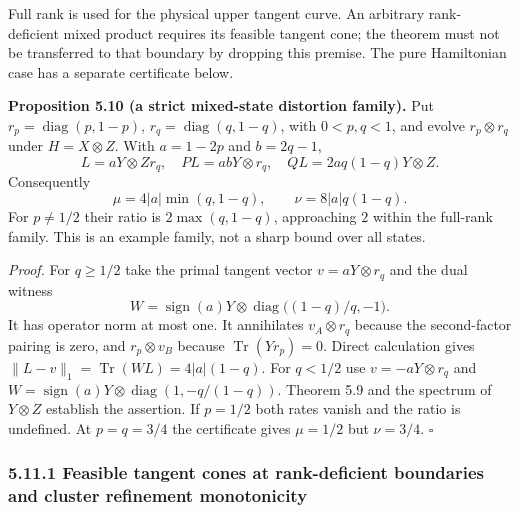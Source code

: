 \documentclass[
  11pt,
]{article}
\begin{document}
Full rank is used for the physical upper tangent curve. An arbitrary
rank-deficient mixed product requires its feasible tangent cone; the theorem
must not be transferred to that boundary by dropping this premise. The pure
Hamiltonian case has a separate certificate below.

\textbf{Proposition 5.10 (a strict mixed-state distortion family).} Put
\(r_p=\operatorname{diag}(p,1-p)\), \(r_q=\operatorname{diag}(q,1-q)\), with
\(0<p,q<1\), and evolve \(r_p\otimes r_q\) under \(H=X\otimes Z\). With
\(a=1-2p\) and \(b=2q-1\),
\[
L=aY\otimes Zr_q,\quad PL=abY\otimes r_q,\quad
QL=2aq(1-q)Y\otimes Z.
\]
Consequently
\[
\mu=4|a|\min(q,1-q),\qquad \nu=8|a|q(1-q).
\]
For \(p\ne1/2\) their ratio is \(2\max(q,1-q)\), approaching \(2\) within the
full-rank family. This is an example family, not a sharp bound over all states.

\emph{Proof.} For \(q\ge1/2\) take the primal tangent vector
\(v=aY\otimes r_q\) and the dual witness
\[
W=\operatorname{sign}(a)Y\otimes
       \operatorname{diag}\bigl((1-q)/q,-1\bigr).
\]
It has operator norm at most one. It annihilates \(v_A\otimes r_q\) because
the second-factor pairing is zero, and \(r_p\otimes v_B\) because
\(\operatorname{Tr}(Yr_p)=0\). Direct calculation gives
\(\lVert L-v\rVert_1=\operatorname{Tr}(WL)=4|a|(1-q)\). For \(q<1/2\) use
\(v=-aY\otimes r_q\) and
\(W=\operatorname{sign}(a)Y\otimes\operatorname{diag}(1,-q/(1-q))\).
Theorem 5.9 and the spectrum of \(Y\otimes Z\) establish the assertion. If
\(p=1/2\) both rates vanish and the ratio is undefined. At \(p=q=3/4\) the
certificate gives \(\mu=1/2\) but \(\nu=3/4\). \(\square\)

\subsubsection{5.11.1 Feasible tangent cones at rank-deficient boundaries and cluster refinement monotonicity}\label{feasible-tangent-cones-at-rank-deficient-boundaries-and-cluster-refinement-monotonicity}
\end{document}
